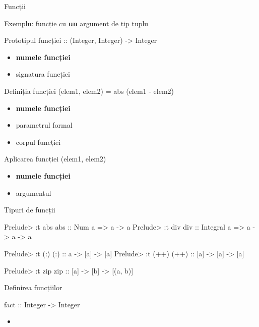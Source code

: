 \documentclass[xcolor=pdftex,romanian,colorlinks]{beamer}
\begin{document}
\begin{section}{Funcții}
\begin{frame}{Exemplu: funcție cu {\bf un} argument de tip tuplu}
\begin{block}{Prototipul funcției \hfill
{\color{black}{\bf dist} {:: (Integer, Integer)  -> Integer}}}
\begin{itemize}
\item {\bf numele funcției}
\item signatura funcției
\end{itemize}
\end{block}
\begin{block}{Definiția funcției \hfill {\color{black}{\bf dist}} \alert{(elem1, elem2)} {\color{black}= abs (elem1 - elem2)}}

\begin{itemize}
\item {\bf numele funcției}
\item \alert{parametrul  formal}
\item corpul funcției
\end{itemize}
\end{block}
\begin{block}{Aplicarea funcției \hfill {\color{black}{\bf dist}} \alert{(elem1, elem2)}}
\begin{itemize}
\item {\bf numele funcției}
\item \alert{argumentul}
\end{itemize}
\end{block}
\end{frame}

\begin{frame}[fragile]{Tipuri de funcții}
\begin{asciihs}

Prelude> :t abs
abs :: Num a => a -> a
Prelude> :t div
div :: Integral a => a -> a -> a

Prelude> :t (:)
(:) :: a -> [a] -> [a]
Prelude> :t (++)
(++) :: [a] -> [a] -> [a]


Prelude> :t zip
zip :: [a] -> [b] -> [(a, b)]
\end{asciihs}
\end{frame}

\begin{frame}[fragile]{Definirea funcțiilor}
\begin{block}{}
\vspace{-2ex}
\begin{asciihs}
fact :: Integer -> Integer
\end{asciihs}
\end{block}
\begin{itemize}
\item {}


\end{itemize}
\end{frame}
\end{section}
\end{document}
